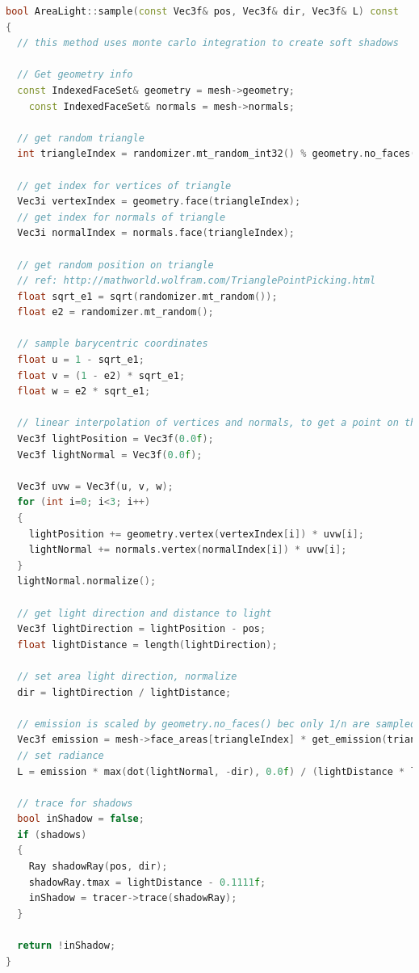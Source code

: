  \newpage
 \begin{lstlisting}[language=C++,caption=AreaLight::sample,label=lst:arealight::sample,firstnumber=18]
 bool AreaLight::sample(const Vec3f& pos, Vec3f& dir, Vec3f& L) const
{
  // this method uses monte carlo integration to create soft shadows

  // Get geometry info
  const IndexedFaceSet& geometry = mesh->geometry;
	const IndexedFaceSet& normals = mesh->normals;

  // get random triangle
  int triangleIndex = randomizer.mt_random_int32() % geometry.no_faces();
  
  // get index for vertices of triangle
  Vec3i vertexIndex = geometry.face(triangleIndex);
  // get index for normals of triangle
  Vec3i normalIndex = normals.face(triangleIndex);

  // get random position on triangle
  // ref: http://mathworld.wolfram.com/TrianglePointPicking.html
  float sqrt_e1 = sqrt(randomizer.mt_random());
  float e2 = randomizer.mt_random();

  // sample barycentric coordinates
  float u = 1 - sqrt_e1;
  float v = (1 - e2) * sqrt_e1;
  float w = e2 * sqrt_e1;
  
  // linear interpolation of vertices and normals, to get a point on the triangle and the according normal
  Vec3f lightPosition = Vec3f(0.0f);
  Vec3f lightNormal = Vec3f(0.0f);
  
  Vec3f uvw = Vec3f(u, v, w);
  for (int i=0; i<3; i++)
  {
    lightPosition += geometry.vertex(vertexIndex[i]) * uvw[i];
    lightNormal += normals.vertex(normalIndex[i]) * uvw[i];
  }
  lightNormal.normalize();
  
  // get light direction and distance to light
  Vec3f lightDirection = lightPosition - pos;
  float lightDistance = length(lightDirection);

  // set area light direction, normalize
  dir = lightDirection / lightDistance;
  
  // emission is scaled by geometry.no_faces() bec only 1/n are sampled
  Vec3f emission = mesh->face_areas[triangleIndex] * get_emission(triangleIndex) * geometry.no_faces();
  // set radiance
  L = emission * max(dot(lightNormal, -dir), 0.0f) / (lightDistance * lightDistance);

  // trace for shadows
  bool inShadow = false;
  if (shadows)
  {
    Ray shadowRay(pos, dir);
    shadowRay.tmax = lightDistance - 0.1111f;
    inShadow = tracer->trace(shadowRay);
  }

  return !inShadow;
}
 \end{lstlisting}
 
